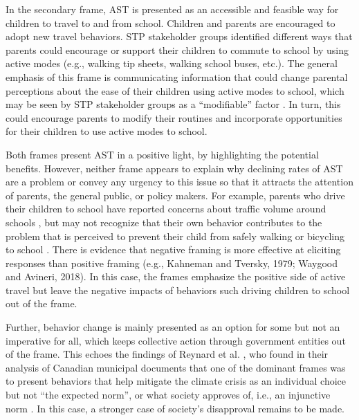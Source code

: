 \documentclass[preprint, 3p,
authoryear]{elsarticle} %
\begin{document}
In the secondary frame, AST is presented as an accessible and feasible
way for children to travel to and from school. Children and parents are
encouraged to adopt new travel behaviors. STP stakeholder groups
identified different ways that parents could encourage or support their
children to commute to school by using active modes (e.g., walking tip
sheets, walking school buses, etc.). The general emphasis of this frame
is communicating information that could change parental perceptions
about the ease of their children using active modes to school, which may
be seen by STP stakeholder groups as a ``modifiable'' factor
\citep[see][]{riaziCorrelatesChildrenIndependent2019}. In turn, this
could encourage parents to modify their routines and incorporate
opportunities for their children to use active modes to school.

Both frames present AST in a positive light, by highlighting the
potential benefits. However, neither frame appears to explain why
declining rates of AST are a problem or convey any urgency to this issue
so that it attracts the attention of parents, the general public, or
policy makers. For example, parents who drive their children to school
have reported concerns about traffic volume around schools
\citep{mammenUnderstandingDriveEscort2012}, but may not recognize that
their own behavior contributes to the problem that is perceived to
prevent their child from safely walking or bicycling to school
\citep{collinsSafeJourneysEnterprising2001, rothmanSchoolEnvironmentStudent2017}.
There is evidence that negative framing is more effective at eliciting
responses than positive framing (e.g., Kahneman and Tversky, 1979;
Waygood and Avineri, 2018). In this case, the frames emphasize the
positive side of active travel but leave the negative impacts of
behaviors such driving children to school out of the frame.

Further, behavior change is mainly presented as an option for some but
not an imperative for all, which keeps collective action through
government entities out of the frame. This echoes the findings of
Reynard et al. \citeyearpar{reynardGrowthResilienceHow2021}, who found
in their analysis of Canadian municipal documents that one of the
dominant frames was to present behaviors that help mitigate the climate
crisis as an individual choice but not ``the expected norm'', or what
society approves of, i.e., an injunctive norm
\citep{lapinski2005explication}. In this case, a stronger case of
society's disapproval remains to be made.
\end{document}
